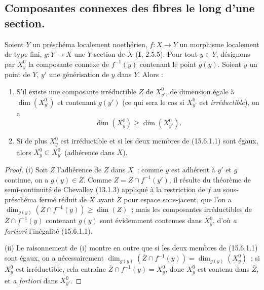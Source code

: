 
\subsection{Composantes connexes des fibres le long d'une section.}
\label{subsection:IV.15.6-fr}

\begin{proposition}[15.6.1]
\label{IV.15.6.1-fr}
Soient $Y$ un préschéma localement noethérien, $f:X\to Y$ un morphisme localement de type fini, $g:Y\to X$ une $Y$-section de $X$ \textup{(\textbf{I}, 2.5.5)}. Pour tout $y\in Y$, désignons par $X_y^0$ la composante connexe de $f^{-1}(y)$ contenant le point $g(y)$. Soient $y$ un point de $Y$, $y'$ une générisation de $y$ dans $Y$. Alors :
\begin{enumerate}[label=\emph{(\roman*)}]
  \item S'il existe une composante irréductible $Z$ de $X_{y'}^0$, de dimension égale à $\dim(X_{y'}^0)$ et contenant $g(y')$ \textup{(ce qui sera le cas si $X_{y'}^0$ est \emph{irréductible})}, on a
\begin{equation}
\tag{15.6.1.1}
\label{IV.15.6.1.1-fr}
  \dim(X_y^0)\geqslant\dim(X_{y'}^0).
\end{equation}
  \item Si de plus $X_y^0$ est irréductible et si les deux membres de \textup{(15.6.1.1)} sont égaux, alors $X_y^0\subset\overline{X_{y'}^0}$ (adhérence dans $X$).
\end{enumerate}
\end{proposition}

\begin{proof}
(i) Soit $\overline Z$ l'adhérence de $Z$ dans $X$~; comme $y$ est adhérent à $y'$ et $g$ continue, on a $g(y)\in\overline Z$. Comme $Z=\overline Z\cap f^{-1}(y')$, il résulte du théorème de semi-continuité de Chevalley (13.1.3) appliqué à la restriction de $f$ au sous-préschéma fermé réduit de $X$ ayant $\overline Z$ pour espace sous-jacent, que l'on a
$\dim_{g(y)}(\overline Z\cap f^{-1}(y))\geqslant\dim(Z)$~;
mais les composantes irréductibles de $\overline Z\cap f^{-1}(y)$ contenant $g(y)$ sont évidemment contenues dans $X_y^0$, d'où \emph{a fortiori} l'inégalité (15.6.1.1).

(ii) Le raisonnement de (i) montre en outre que si les deux membres de (15.6.1.1) sont égaux, on a nécessairement
$\dim_{g(y)}(\overline Z\cap f^{-1}(y))=\dim_{g(y)}(X_y^0)$~;
si $X_y^0$ est irréductible, cela entraîne $\overline Z\cap f^{-1}(y)=X_y^0$, donc $X_y^0$ est contenu dans $\overline Z$, et \emph{a fortiori} dans $\overline{X_{y'}^0}$.
\end{proof}

